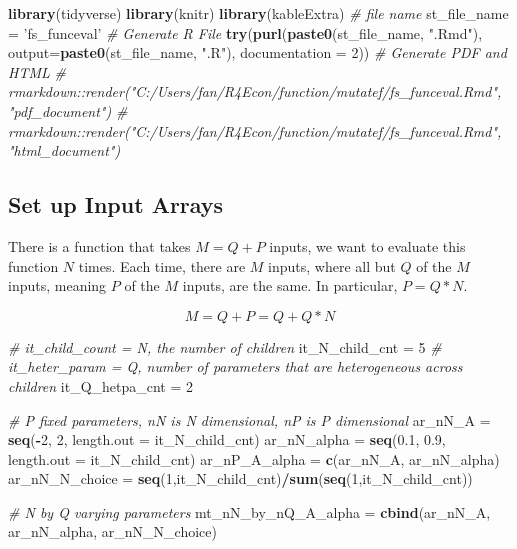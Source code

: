 \documentclass[
]{article}
\newenvironment{Shaded}{\begin{snugshade}}{\end{snugshade}}
\newcommand{\CommentTok}[1]{\textcolor[rgb]{0.56,0.35,0.01}{\textit{#1}}}
\newcommand{\DataTypeTok}[1]{\textcolor[rgb]{0.13,0.29,0.53}{#1}}
\newcommand{\DecValTok}[1]{\textcolor[rgb]{0.00,0.00,0.81}{#1}}
\newcommand{\FloatTok}[1]{\textcolor[rgb]{0.00,0.00,0.81}{#1}}
\newcommand{\KeywordTok}[1]{\textcolor[rgb]{0.13,0.29,0.53}{\textbf{#1}}}
\newcommand{\NormalTok}[1]{#1}
\newcommand{\OperatorTok}[1]{\textcolor[rgb]{0.81,0.36,0.00}{\textbf{#1}}}
\newcommand{\StringTok}[1]{\textcolor[rgb]{0.31,0.60,0.02}{#1}}
\begin{document}
\begin{Shaded}
\begin{Highlighting}[]
\KeywordTok{library}\NormalTok{(tidyverse)}
\KeywordTok{library}\NormalTok{(knitr)}
\KeywordTok{library}\NormalTok{(kableExtra)}
\CommentTok{# file name}
\NormalTok{st_file_name =}\StringTok{ 'fs_funceval'}
\CommentTok{# Generate R File}
\KeywordTok{try}\NormalTok{(}\KeywordTok{purl}\NormalTok{(}\KeywordTok{paste0}\NormalTok{(st_file_name, }\StringTok{".Rmd"}\NormalTok{), }\DataTypeTok{output=}\KeywordTok{paste0}\NormalTok{(st_file_name, }\StringTok{".R"}\NormalTok{), }\DataTypeTok{documentation =} \DecValTok{2}\NormalTok{))}
\CommentTok{# Generate PDF and HTML}
\CommentTok{# rmarkdown::render("C:/Users/fan/R4Econ/function/mutatef/fs_funceval.Rmd", "pdf_document")}
\CommentTok{# rmarkdown::render("C:/Users/fan/R4Econ/function/mutatef/fs_funceval.Rmd", "html_document")}
\end{Highlighting}
\end{Shaded}

\hypertarget{set-up-input-arrays}{%
\subsection{Set up Input Arrays}\label{set-up-input-arrays}}

There is a function that takes \(M=Q+P\) inputs, we want to evaluate
this function \(N\) times. Each time, there are \(M\) inputs, where all
but \(Q\) of the \(M\) inputs, meaning \(P\) of the \(M\) inputs, are
the same. In particular, \(P=Q*N\).

\[M = Q+P = Q + Q*N\]

\begin{Shaded}
\begin{Highlighting}[]
\CommentTok{# it_child_count = N, the number of children}
\NormalTok{it_N_child_cnt =}\StringTok{ }\DecValTok{5}
\CommentTok{# it_heter_param = Q, number of parameters that are heterogeneous across children}
\NormalTok{it_Q_hetpa_cnt =}\StringTok{ }\DecValTok{2}

\CommentTok{# P fixed parameters, nN is N dimensional, nP is P dimensional}
\NormalTok{ar_nN_A =}\StringTok{ }\KeywordTok{seq}\NormalTok{(}\OperatorTok{-}\DecValTok{2}\NormalTok{, }\DecValTok{2}\NormalTok{, }\DataTypeTok{length.out =}\NormalTok{ it_N_child_cnt)}
\NormalTok{ar_nN_alpha =}\StringTok{ }\KeywordTok{seq}\NormalTok{(}\FloatTok{0.1}\NormalTok{, }\FloatTok{0.9}\NormalTok{, }\DataTypeTok{length.out =}\NormalTok{ it_N_child_cnt)}
\NormalTok{ar_nP_A_alpha =}\StringTok{ }\KeywordTok{c}\NormalTok{(ar_nN_A, ar_nN_alpha)}
\NormalTok{ar_nN_N_choice =}\StringTok{ }\KeywordTok{seq}\NormalTok{(}\DecValTok{1}\NormalTok{,it_N_child_cnt)}\OperatorTok{/}\KeywordTok{sum}\NormalTok{(}\KeywordTok{seq}\NormalTok{(}\DecValTok{1}\NormalTok{,it_N_child_cnt))}

\CommentTok{# N by Q varying parameters}
\NormalTok{mt_nN_by_nQ_A_alpha =}\StringTok{ }\KeywordTok{cbind}\NormalTok{(ar_nN_A, ar_nN_alpha, ar_nN_N_choice)}
\end{Highlighting}
\end{Shaded}
\end{document}
